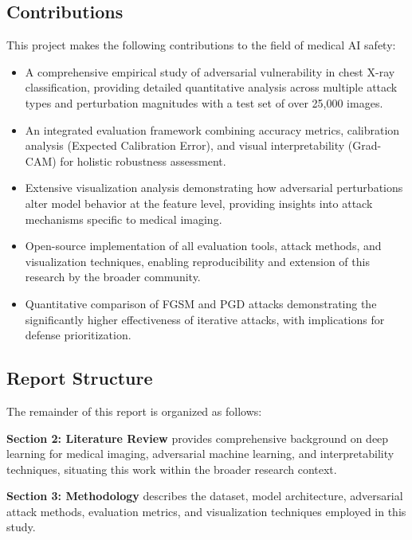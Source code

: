 \documentclass[12pt,a4paper]{article}
\begin{document}
\subsection{Contributions}

This project makes the following contributions to the field of medical AI safety:

\begin{itemize}[leftmargin=*]
    \item A comprehensive empirical study of adversarial vulnerability in chest X-ray classification, providing detailed quantitative analysis across multiple attack types and perturbation magnitudes with a test set of over 25,000 images.
    
    \item An integrated evaluation framework combining accuracy metrics, calibration analysis (Expected Calibration Error), and visual interpretability (Grad-CAM) for holistic robustness assessment.
    
    \item Extensive visualization analysis demonstrating how adversarial perturbations alter model behavior at the feature level, providing insights into attack mechanisms specific to medical imaging.
    
    \item Open-source implementation of all evaluation tools, attack methods, and visualization techniques, enabling reproducibility and extension of this research by the broader community.
    
    \item Quantitative comparison of FGSM and PGD attacks demonstrating the significantly higher effectiveness of iterative attacks, with implications for defense prioritization.
\end{itemize}

\subsection{Report Structure}

The remainder of this report is organized as follows:

\textbf{Section 2: Literature Review} provides comprehensive background on deep learning for medical imaging, adversarial machine learning, and interpretability techniques, situating this work within the broader research context.

\textbf{Section 3: Methodology} describes the dataset, model architecture, adversarial attack methods, evaluation metrics, and visualization techniques employed in this study.
\end{document}

